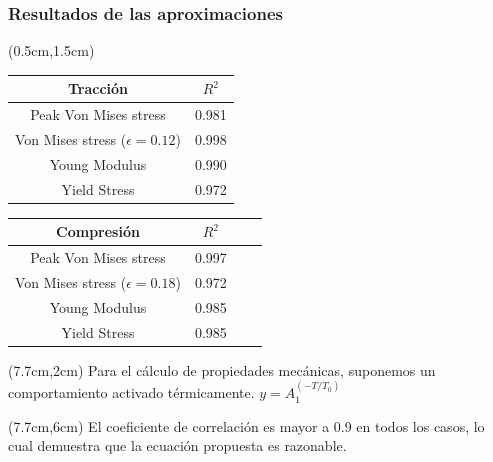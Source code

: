 \begin{frame}
 \frametitle{Resultados de las aproximaciones}
 \begin{textblock*}{6cm}(0.5cm,1.5cm) 
    
    \begin{table}[htp]
    \begin{center}
    \begin{tabular}{c c}
    \hline
    \textbf{Tracci\'on} & $R^{2}$ \\ \hline \hline
    Peak Von Mises stress &  0.981 \\ \hline
    Von Mises stress ($\epsilon=0.12$) & 0.998 \\ \hline
    Young Modulus & 0.990 \\ \hline
    Yield Stress &  0.972 \\ \hline
    \end{tabular}
    \end{center}
    \end{table}

    \begin{table}[htp]
    \begin{center}
    \begin{tabular}{*{4}{c}}
    \hline
    \textbf{Compresi\'on} & $R^{2}$ \\ \hline \hline
    Peak Von Mises stress & 0.997 \\ \hline
    Von Mises stress ($\epsilon=0.18$) & 0.972 \\ \hline
    Young Modulus & 0.985 \\ \hline
    Yield Stress & 0.985 \\ \hline
    \end{tabular}
    \end{center}
    \end{table}
 \end{textblock*}
  \begin{textblock*}{4.8cm}(7.7cm,2cm)
  \centering
   Para el c\'alculo de propiedades mec\'anicas, suponemos un comportamiento activado t\'ermicamente.
    $y=A_1^{(-T/T_0)}$
  \end{textblock*}
  \begin{textblock*}{4.8cm}(7.7cm,6cm)
  \centering
   El coeficiente de correlaci\'on es mayor a 0.9 en todos los casos, lo cual demuestra que la ecuaci\'on propuesta es razonable.
  \end{textblock*}
\end{frame}


